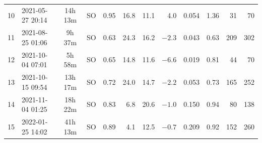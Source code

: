 \begin{table}[ht]
\begin{tabular}{c l c c r r r r r r r r}
    10 & 2021-05-27 20:14 & 14h 13m & SO & 0.95 & 16.8 & 11.1 & 4.0 & 0.054 & 1.36 & 31 & 70 \\
    11 & 2021-08-25 01:06 & 9h 37m & SO & 0.63 & 24.3 & 16.2 & $-2.3$ & 0.043 & 0.63 & 209 & 302 \\
    12 & 2021-10-04 07:01 & 5h 58m & SO & 0.65 & 14.8 & 11.6 & $-6.6$ & 0.019 & 0.81 & 44 & 70 \\
    13 & 2021-10-15 09:54 & 13h 17m & SO & 0.72 & 24.0 & 14.7 & $-2.2$ & 0.053 & 0.73 & 165 & 252 \\
    14 & 2021-11-04 01:25 & 18h 22m & SO & 0.83 & 6.8 & 20.6 & $-1.0$ & 0.150 & 0.94 & 80 & 138 \\
    15 & 2022-01-25 14:02 & 41h 13m & SO & 0.89 & 4.1 & 12.5 & $-0.7$ & 0.209 & 0.92 & 152 & 260 \\
    \bottomrule
  \end{tabular}
\end{table}